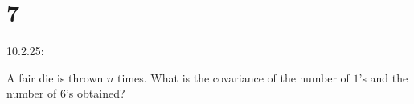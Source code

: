 \documentclass{article}
\begin{document}

\hfil

\hfil

\section*{7}
\begin{ques}\label{q7}
    10.2.25:

    A fair die is thrown $n$ times. What is the covariance of the number of $1$'s and the number of $6$'s obtained?
\end{ques}
\end{document}
